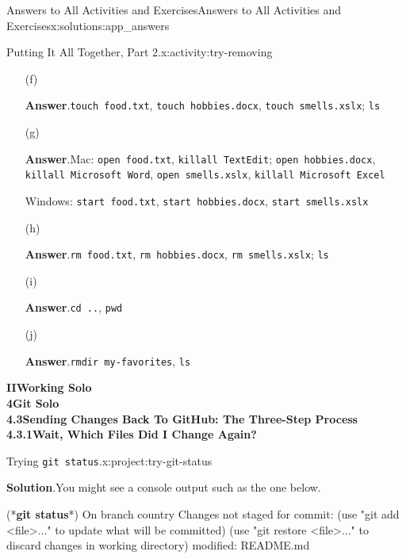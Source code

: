 \documentclass[oneside,10pt,]{book}
\newcommand{\blocktitlefont}{\relax}
\newcommand{\mono}[1]{\texttt{#1}}
\newcommand{\consoleinput}[1]{\textbf{#1}}
\begin{document}
\begin{solutions-chapter}{Answers to All Activities and Exercises}{}{Answers to All Activities and Exercises}{}{}{x:solutions:app_answers}
\begin{activitysolution}{2.3}{Putting It All Together, Part 2.}{x:activity:try-removing}
\begin{enumerate}[font=\bfseries,label=(\alph*),ref=\alph*]
\item[(f)]\par\smallskip%
\noindent\textbf{\blocktitlefont Answer}.\hypertarget{g:answer:idm480445560-back}{}\quad{}\mono{touch food.txt}, \mono{touch hobbies.docx}, \mono{touch smells.xslx}; \mono{ls}%
\item[(g)]\par\smallskip%
\noindent\textbf{\blocktitlefont Answer}.\hypertarget{g:answer:idm480437496-back}{}\quad{}Mac: \mono{open food.txt}, \mono{killall TextEdit}; \mono{open hobbies.docx}, \mono{killall \textquotesingle{}Microsoft Word\textquotesingle{}}, \mono{open smells.xslx}, \mono{killall \textquotesingle{}Microsoft Excel\textquotesingle{}}%
\par
Windows: \mono{start food.txt}, \mono{start hobbies.docx}, \mono{start smells.xslx}%
\item[(h)]\par\smallskip%
\noindent\textbf{\blocktitlefont Answer}.\hypertarget{g:answer:idm480431608-back}{}\quad{}\mono{rm food.txt}, \mono{rm hobbies.docx}, \mono{rm smells.xslx}; \mono{ls}%
\item[(i)]\par\smallskip%
\noindent\textbf{\blocktitlefont Answer}.\hypertarget{g:answer:idm480438648-back}{}\quad{}\mono{cd ..}, \mono{pwd}%
\item[(j)]\par\smallskip%
\noindent\textbf{\blocktitlefont Answer}.\hypertarget{g:answer:idm480429304-back}{}\quad{}\mono{rmdir my-favorites}, \mono{ls}%
\end{enumerate}
\end{activitysolution}%
\par\medskip
\noindent\textbf{\Large{}II\space\textperiodcentered\space{}Working Solo\\
4\space\textperiodcentered\space{}Git Solo\\
4.3\space\textperiodcentered\space{}Sending Changes Back To GitHub: The Three-Step Process\\
4.3.1\space\textperiodcentered\space{}Wait, Which Files Did I Change Again?}
\begin{projectsolution}{4.4}{Trying \mono{git status}.}{x:project:try-git-status}%
\par\smallskip%
\noindent\textbf{\blocktitlefont Solution}.\hypertarget{g:solution:idm480034136-back}{}\quad{}You might see a console output such as the one below.%
\begin{console}{0}{1}{0}
(*\consoleinput{git status}*)
On branch country
Changes not staged for commit:
  (use "git add <file>..." to update what will be committed)
  (use "git restore <file>..." to discard changes in working directory)
        modified:   README.md


\end{console}
\end{projectsolution}
\end{solutions-chapter}
\end{document}
